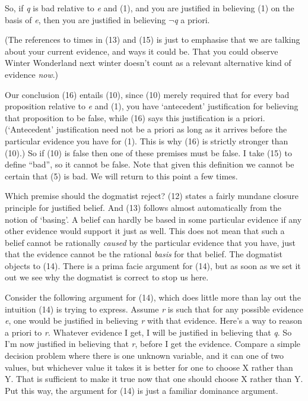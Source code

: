 {\item So, if \textit{q} is bad relative to \textit{e} and (1), and you are justified in believing (1) on the basis of \textit{e}, then you are justified in believing \(\neg\)\textit{q} a priori.
}

\noindent (The references to times in (13) and (15) is just to emphasise that we are talking about your current evidence, and ways it could be. That you could observe Winter Wonderland next winter doesn't count as a relevant alternative kind of evidence \textit{now}.)

Our conclusion (16) entails (10), since (10) merely required that for every bad proposition relative to \textit{e} and (1), you have `antecedent' justification for believing that proposition to be false, while (16) says this justification is a priori. (`Antecedent' justification need not be a priori as long as it arrives before the particular evidence you have for (1). This is why (16) is strictly stronger than (10).) So if (10) is false then one of these premises must be false. I take (15) to define ``bad'', so it cannot be false. Note that given this definition we cannot be certain that (5) is bad. We will return to this point a few times.

Which premise should the dogmatist reject?{ }(12) states a fairly mundane closure principle for justified belief. And (13) follows almost automatically from the notion of `basing'. A belief can hardly be based in some particular evidence if any other evidence would support it just as well. This does not mean that such a belief cannot be rationally \textit{caused} by the particular evidence that you have, just that the evidence cannot be the rational \textit{basis} for that belief. The dogmatist objects to (14). There is a prima facie argument for (14), but as soon as we set it out we see why the dogmatist is correct to stop us here. 

Consider the following argument for (14), which does little more than lay out the intuition (14) is trying to express. Assume \textit{r} is such that for any possible evidence \textit{e}, one would be justified in believing \textit{r} with that evidence. Here's a way to reason a priori to \textit{r}. Whatever evidence I get, I will be justified in believing that \textit{q}. So I'm now justified in believing that \textit{r}, before I get the evidence. Compare a simple decision problem where there is one unknown variable, and it can one of two values, but whichever value it takes it is better for one to choose X rather than Y. That is sufficient to make it true now that one should choose X rather than Y. Put this way, the argument for (14) is just a familiar dominance argument.

